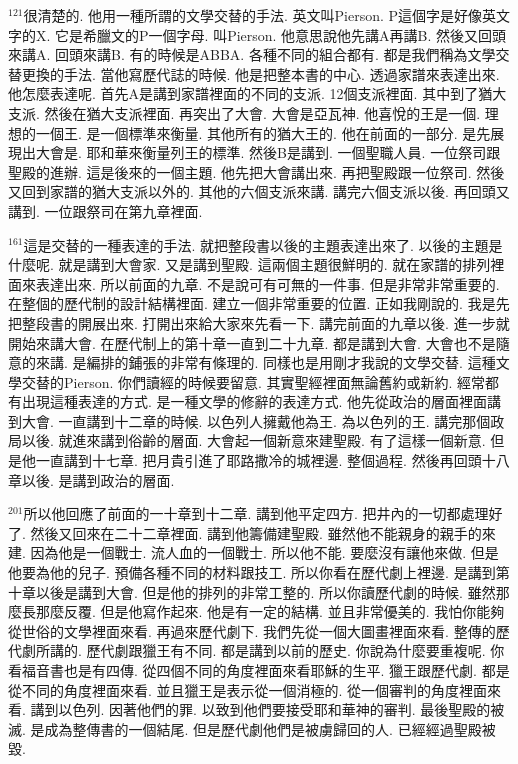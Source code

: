 \documentclass{book}
\begin{document}
$^{121}$很清楚的.
他用一種所謂的文學交替的手法.
英文叫Pierson.
P這個字是好像英文字的X.
它是希臘文的P一個字母.
叫Pierson.
他意思說他先講A再講B.
然後又回頭來講A.
回頭來講B.
有的時候是ABBA.
各種不同的組合都有.
都是我們稱為文學交替更換的手法.
當他寫歷代誌的時候.
他是把整本書的中心.
透過家譜來表達出來.
他怎麼表達呢.
首先A是講到家譜裡面的不同的支派.
12個支派裡面.
其中到了猶大支派.
然後在猶大支派裡面.
再突出了大會.
大會是亞瓦神.
他喜悅的王是一個.
理想的一個王.
是一個標準來衡量.
其他所有的猶大王的.
他在前面的一部分.
是先展現出大會是.
耶和華來衡量列王的標準.
然後B是講到.
一個聖職人員.
一位祭司跟聖殿的進辦.
這是後來的一個主題.
他先把大會講出來.
再把聖殿跟一位祭司.
然後又回到家譜的猶大支派以外的.
其他的六個支派來講.
講完六個支派以後.
再回頭又講到.
一位跟祭司在第九章裡面.

$^{161}$這是交替的一種表達的手法.
就把整段書以後的主題表達出來了.
以後的主題是什麼呢.
就是講到大會家.
又是講到聖殿.
這兩個主題很鮮明的.
就在家譜的排列裡面來表達出來.
所以前面的九章.
不是說可有可無的一件事.
但是非常非常重要的.
在整個的歷代制的設計結構裡面.
建立一個非常重要的位置.
正如我剛說的.
我是先把整段書的開展出來.
打開出來給大家來先看一下.
講完前面的九章以後.
進一步就開始來講大會.
在歷代制上的第十章一直到二十九章.
都是講到大會.
大會也不是隨意的來講.
是編排的鋪張的非常有條理的.
同樣也是用剛才我說的文學交替.
這種文學交替的Pierson.
你們讀經的時候要留意.
其實聖經裡面無論舊約或新約.
經常都有出現這種表達的方式.
是一種文學的修辭的表達方式.
他先從政治的層面裡面講到大會.
一直講到十二章的時候.
以色列人擁戴他為王.
為以色列的王.
講完那個政局以後.
就進來講到俗齡的層面.
大會起一個新意來建聖殿.
有了這樣一個新意.
但是他一直講到十七章.
把月貴引進了耶路撒冷的城裡邊.
整個過程.
然後再回頭十八章以後.
是講到政治的層面.

$^{201}$所以他回應了前面的一十章到十二章.
講到他平定四方.
把井內的一切都處理好了.
然後又回來在二十二章裡面.
講到他籌備建聖殿.
雖然他不能親身的親手的來建.
因為他是一個戰士.
流人血的一個戰士.
所以他不能.
要麼沒有讓他來做.
但是他要為他的兒子.
預備各種不同的材料跟技工.
所以你看在歷代劇上裡邊.
是講到第十章以後是講到大會.
但是他的排列的非常工整的.
所以你讀歷代劇的時候.
雖然那麼長那麼反覆.
但是他寫作起來.
他是有一定的結構.
並且非常優美的.
我怕你能夠從世俗的文學裡面來看.
再過來歷代劇下.
我們先從一個大圖畫裡面來看.
整傳的歷代劇所講的.
歷代劇跟獵王有不同.
都是講到以前的歷史.
你說為什麼要重複呢.
你看福音書也是有四傳.
從四個不同的角度裡面來看耶穌的生平.
獵王跟歷代劇.
都是從不同的角度裡面來看.
並且獵王是表示從一個消極的.
從一個審判的角度裡面來看.
講到以色列.
因著他們的罪.
以致到他們要接受耶和華神的審判.
最後聖殿的被滅.
是成為整傳書的一個結尾.
但是歷代劇他們是被虜歸回的人.
已經經過聖殿被毀.
\end{document}
